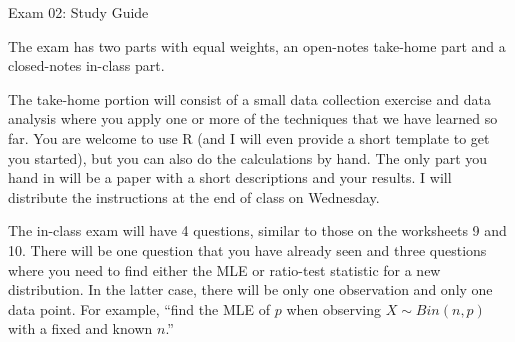 \documentclass{tufte-handout}
\begin{document}
\justify

{\LARGE Exam 02: Study Guide}

\vspace*{18pt}

\noindent
The exam has two parts with equal weights, an open-notes
take-home part and a closed-notes in-class part.

\vspace*{18pt}

\noindent
The take-home
portion will consist of a small data collection exercise and
data analysis where you apply one or more of the techniques that
we have learned so far. You are welcome to use R (and I will 
even provide a short template to get you started), but you
can also do the calculations by hand. The only part you hand
in will be a paper with a short descriptions and your results.
I will distribute the instructions at the end of class on Wednesday.

\vspace*{18pt}

\noindent
The in-class exam will have 4 questions, similar to those on the
worksheets 9 and 10. There will be one question that you have 
already seen and three questions where you need to find either the
MLE or ratio-test statistic for a new distribution. In the latter
case, there will be only one observation and only one data point.
For example, ``find the MLE of $p$ when observing $X \sim Bin(n, p)$
with a fixed and known $n$.'' 
\end{document}
